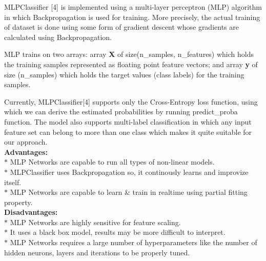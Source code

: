 \documentclass[a4paper, 10pt, conference]{IEEEtran}
\begin{document}
MLPClassifier [4] is implemented using a multi-layer perceptron (MLP) algorithm in which Backpropagation is used for training. More precisely, the actual training of dataset is done using some form of gradient descent whose gradients are calculated using Backpropagation.

MLP trains on two arrays: array \textbf{X} of size(n\_samples, n\_features) which holds the training samples represented as floating point feature vectors; and array \textbf{y} of size (n\_samples) which holds the target values (class labels) for the training samples. 

Currently, MLPClassifier[4] supports only the Cross-Entropy loss function, using which we can derive the estimated probabilities by running predict\_proba function. The model also supports multi-label classification in which any input feature set can belong to more than one class which makes it quite suitable for our approach. \\

\textbf{Advantages:}\\
\indent $\ast$ MLP Networks are capable to run all types of non-linear models.\\
\indent $\ast$ MLPClassifier uses Backpropagation so, it continously learns and improvize itself.\\
\indent $\ast$ MLP Networks are capable to learn \& train in real\-time using partial fitting property.\\

\textbf{Disadvantages:}\\
\indent $\ast$ MLP Networks are highly sensitive for feature scaling.\\
\indent $\ast$ It uses a black box model, results may be more difficult to interpret.\\
\indent $\ast$ MLP Networks requires a large number of hyperparameters like the number of hidden neurons, layers and iterations to be properly tuned.
\end{document}
